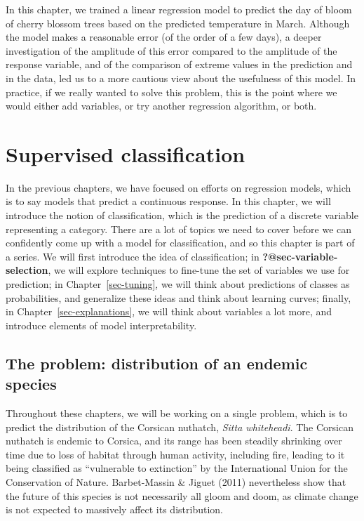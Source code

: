 \documentclass[
  letterpaper,
]{scrbook}
\begin{document}
In this chapter, we trained a linear regression model to predict the day
of bloom of cherry blossom trees based on the predicted temperature in
March. Although the model makes a reasonable error (of the order of a
few days), a deeper investigation of the amplitude of this error
compared to the amplitude of the response variable, and of the
comparison of extreme values in the prediction and in the data, led us
to a more cautious view about the usefulness of this model. In practice,
if we really wanted to solve this problem, this is the point where we
would either add variables, or try another regression algorithm, or
both.


\chapter{Supervised classification}\label{sec-classification}

In the previous chapters, we have focused on efforts on regression
models, which is to say models that predict a continuous response. In
this chapter, we will introduce the notion of classification, which is
the prediction of a discrete variable representing a category. There are
a lot of topics we need to cover before we can confidently come up with
a model for classification, and so this chapter is part of a series. We
will first introduce the idea of classification; in
\textbf{?@sec-variable-selection}, we will explore techniques to
fine-tune the set of variables we use for prediction; in
Chapter~\ref{sec-tuning}, we will think about predictions of classes as
probabilities, and generalize these ideas and think about learning
curves; finally, in Chapter~\ref{sec-explanations}, we will think about
variables a lot more, and introduce elements of model interpretability.

\section{The problem: distribution of an endemic
species}\label{the-problem-distribution-of-an-endemic-species}

Throughout these chapters, we will be working on a single problem, which
is to predict the distribution of the Corsican nuthatch, \emph{Sitta
whiteheadi}. The Corsican nuthatch is endemic to Corsica, and its range
has been steadily shrinking over time due to loss of habitat through
human activity, including fire, leading to it being classified as
``vulnerable to extinction'' by the International Union for the
Conservation of Nature. Barbet-Massin \& Jiguet (2011) nevertheless show
that the future of this species is not necessarily all gloom and doom,
as climate change is not expected to massively affect its distribution.
\end{document}
